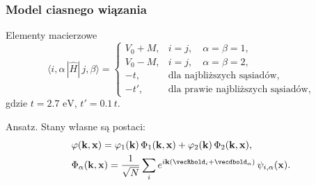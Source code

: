 \documentclass[10pt,t]{beamer}
\begin{document}
\begin{frame}
  \frametitle{Model ciasnego wiązania}


  Elementy macierzowe
  \begin{equation}
    \label{eq:Grafen-czyli-05}
    \langle i, \alpha \, | \widehat{ H } | \, j, \beta \rangle =
    \begin{cases}
      V_{ 0 } + M, & i = j, \quad \alpha = \beta = 1, \\
      V_{ 0 } - M, & i = j, \quad \alpha = \beta = 2, \\
      -t,  & \textrm{dla najbliższych sąsiadów,} \\
      -t', & \textrm{dla prawie najbliższych sąsiadów,}
    \end{cases}
  \end{equation}
  gdzie $t = 2.7 \textrm{ eV}$, $t' = 0.1 \, t$.

  Ansatz. Stany własne są postaci:
  \begin{subequations}
    \begin{align}
      \label{eq:Grafen-czyli-06-A}
      &\varphi( \veckbold, \vecxbold ) =
        \varphi_{ 1 }( \veckbold ) \, \Phi_{ 1 }( \veckbold, \vecxbold )
        + \varphi_{ 2 }( \veckbold ) \, \Phi_{ 2 }( \veckbold, \vecxbold ), \\
      \label{eq:Grafen-czyli-06-B}
      &\Phi_{ \alpha }( \veckbold , \vecxbold ) =
        \frac{ 1 }{ \sqrt{ N } }
        \sum_{ i } e^{ i \veckbold ( \vecRbold_{ i } + \vecdbold_{ \alpha } ) } \,
        \psi_{ i, \alpha }( \vecxbold ).
    \end{align}
  \end{subequations}

\end{frame}
\end{document}
